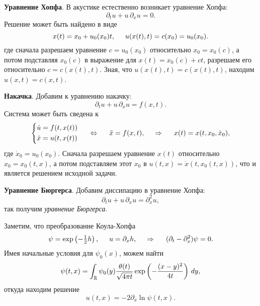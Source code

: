 

\textbf{Уравнение Хопфа}.
В акустике естественно возникает уравнение Хопфа:
\begin{equation*}
    \partial_t u + u\, \partial_x u = 0.
\end{equation*}
Решение может быть найдено в виде
\begin{equation*}
    x(t) = x_0 + u_0 (x_0) t, \hspace{5 mm} 
    u(x(t), t) = c(x_0) = u_0 (x_0).
\end{equation*}
где сначала разрешаем уравнение $c = u_0 (x_0)$ относительно $x_0 = x_0(c)$, а потом подставляя $x_0(c)$ в выражение для $x(t) = x_0 (c) + c t$, разрешаем его относительно $c = c(x(t), t)$. 
Зная, что $u(x(t), t) = c(x(t), t)$, находим $u(x, t) = c(x, t)$. 

\textbf{Накачка}.  Добавим к уравнению накачку:
\begin{equation*}
    \partial_t u + u\, \partial_x u = f(x, t).
\end{equation*}
Система может быть сведена к
\begin{equation*}
    \left\{\begin{aligned}
        \dot{u} &= f(t, x(t)) \\
        \dot{x} &= u(t, x(t))
    \end{aligned}\right.
    \hspace{5 mm} \Leftrightarrow \hspace{5 mm} 
    \ddot{x} = f(x, t),
    \hspace{0.5cm} \Rightarrow \hspace{0.5cm}
    x(t) = x(t, x_0, \dot{x}_0),
\end{equation*}
где $\dot{x}_0 = u_0(x_0)$. Сначала разрешаем уравнение $x(t)$ относительно $x_0 = x_0(t, x)$, а потом подставляем этот $x_0$ в $u(t, x) = \dot{x}(t, x_0(t,x))$, что и является решением исходной задачи.



\textbf{Уравнение Бюргерса}.
Добавим диссипацию в уравнение Хопфа:
\begin{equation*}
    \partial_t u + u\, \partial_x u = \partial_x^2 u,
\end{equation*}
так получим \textit{уравнение Бюргерса}.

Заметим, что преобразование Коула-Хопфа
\begin{equation*}
    \psi = \exp\left(- \tfrac{1}{2}h\right),
    \hspace{5 mm} 
    u = \partial_x h,
    \hspace{0.5cm} \Rightarrow \hspace{0.5cm}
    (\partial_t - \partial_x^2)\psi = 0.
\end{equation*}
Имея начальные условия для $\psi_0(x)$, можем найти
\begin{equation*}
    \psi(t, x) = \int_{\mathbb{R}} \psi_0 (y) \frac{\theta(t)}{\sqrt{4 \pi t}} \exp\left(-\frac{(x-y)^2}{4t}\right) \, d y,
\end{equation*}
откуда находим решение
\begin{equation*}
    u(t, x) =  -2 \partial_x \ln \psi(t, x).
\end{equation*}
